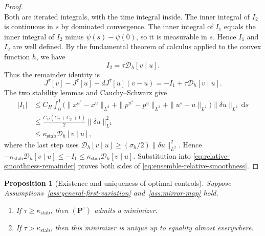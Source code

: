 \documentclass[11pt]{amsart}
\numberwithin{equation}{section} %
\newcommand{\dd}{\mathrm{d}}
\newtheorem{proposition}{Proposition}[section]
\theoremstyle{remark}
\begin{document}
\begin{proof}
\[\]
Both are iterated integrals, with the time integral inside. The
inner integral of $I_2$ is continuous in $s$ by dominated convergence.
The inner integral of $I_1$ equals the inner integral of $I_2$ minus
$\psi(s)-\psi(0)$, so it is measurable in $s$. Hence $I_1$ and $I_2$
are well defined.
By the fundamental theorem of calculus applied to the convex function $h$, we have
\[
I_2 =\tau\mathcal D_h[v\mid u].
\]
Thus the remainder identity is
\begin{equation}
\label{eq:relative-smoothness-remainder}
J^\tau[v]-J^\tau[u]-dJ^\tau[u](v-u)
=-I_1+\tau\mathcal D_h[v\mid u].
\end{equation}
The two stability lemmas and Cauchy--Schwarz give
\begin{align*}
|I_1|&\le C_H\int_0^1
\bigl(\|x^{u^s}-x^u\|_{L^2}+\|p^{u^s}-p^u\|_{L^2}
+\|u^s-u\|_{L^2}\bigr)\|\delta u\|_{L^2}\,\dd s\\
&\le\frac{C_H(C_x+C_p+1)}2\|\delta u\|_{L^2}^2\\
&\le\kappa_{\mathrm{stab}}\mathcal D_h[v\mid u],
\end{align*}
where the last step uses
$\mathcal D_h[v\mid u]\ge(\sigma_h/2)\|\delta u\|_{L^2}^2$.
Hence $-\kappa_{\mathrm{stab}}\mathcal D_h[v\mid u]\le-I_1
\le\kappa_{\mathrm{stab}}\mathcal D_h[v\mid u]$.
Substitution into \eqref{eq:relative-smoothness-remainder} proves both
sides of \eqref{eq:ensemble-relative-smoothness}.
\end{proof}

\begin{proposition}[Existence and uniqueness of optimal controls]
\label{prop:existence-uniqueness}
Suppose Assumptions~\ref{ass:general-first-variation} and~\ref{ass:mirror-map} hold.

\begin{enumerate}
\item If $\tau\ge \kappa_{\mathrm{stab}}$, then $(\mathbf P^\tau)$ admits a
minimizer.
\item If $\tau>\kappa_{\mathrm{stab}}$, then this minimizer is unique
up to equality almost everywhere.
\end{enumerate}
\end{proposition}
\end{document}
